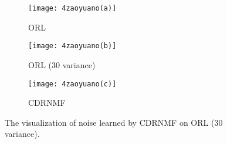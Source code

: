 \documentclass[a4paper,fleqn]{cas-sc}
\begin{document}
\begin{figure}[!t]
	\centering
	\begin{subfigure}[b]{.23\textwidth}
		\centering
		\texttt{[image: 4zaoyuano(a)]}
		\caption{ORL}\label{subfig:4zaoyuano(a)}
	\end{subfigure}
	\begin{subfigure}[b]{.23\textwidth}
		\centering
		\texttt{[image: 4zaoyuano(b)]}
		\caption{ORL (30 variance)}\label{subfig:4zaoyuano(b)}
	\end{subfigure}
	\begin{subfigure}[b]{.23\textwidth}
		\centering
		\texttt{[image: 4zaoyuano(c)]}
		\caption{CDRNMF}\label{subfig:4zaoyuano(c)}
	\end{subfigure}
	
	\caption{The visualization of noise learned by CDRNMF on ORL (30 variance).}\label{fig:4zaoyuano}
\end{figure}
\end{document}
